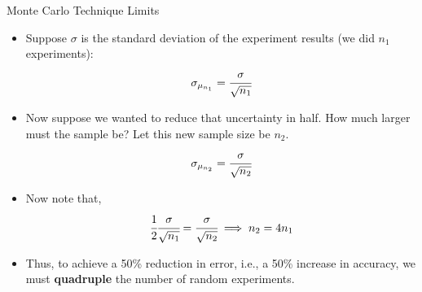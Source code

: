 \documentclass{beamer}
\begin{document}
\begin{frame}{Monte Carlo Technique Limits}
\begin{itemize}
\item Suppose $\sigma$ is the standard deviation of the experiment results (we did $n_1$ experiments):
\begin{equation*}
\sigma_{\mu_{n_1}} = \cfrac{\sigma}{\sqrt{n_1}}
\end{equation*}
\item Now suppose we wanted to reduce that uncertainty in half. How much larger must the sample be? Let this new sample size be $n_2$. 
\begin{equation*}
	\sigma_{\mu_{n_2}} = \cfrac{\sigma}{\sqrt{n_2}}
\end{equation*}
\item Now note that,
\begin{equation*}
\cfrac{1}{2}\cfrac{\sigma}{\sqrt{n_1}}  = \cfrac{\sigma}{\sqrt{n_2}} \implies n_2 = 4 n_1
\end{equation*}
\item Thus, to achieve a 50\% reduction in error, i.e., a 50\% increase in accuracy, we must \textbf{quadruple} the number of random experiments.
\end{itemize}
\end{frame}
\end{document}
